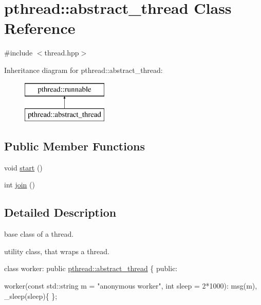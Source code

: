 \hypertarget{classpthread_1_1abstract__thread}{}\section{pthread\+:\+:abstract\+\_\+thread Class Reference}
\label{classpthread_1_1abstract__thread}


{\ttfamily \#include $<$thread.\+hpp$>$}

Inheritance diagram for pthread\+:\+:abstract\+\_\+thread\+:\begin{figure}[H]
\begin{center}
\leavevmode
\includegraphics[height=2.000000cm]{classpthread_1_1abstract__thread}
\end{center}
\end{figure}
\subsection*{Public Member Functions}
\begin{DoxyCompactItemize}
\item 
void \hyperlink{classpthread_1_1abstract__thread_ab121718028f3ca68d45db84d10ff2a3a}{start} ()
\item 
int \hyperlink{classpthread_1_1abstract__thread_aedac81bb9eb76ba92c49c48d797ea25b}{join} ()
\end{DoxyCompactItemize}


\subsection{Detailed Description}
base class of a thread.

utility class, that wraps a thread. 
\begin{DoxyPre}{\ttfamily 
class worker: public \hyperlink{classpthread_1_1abstract__thread}{pthread::abstract\_thread} \{
public:}\end{DoxyPre}



\begin{DoxyPre}{\ttfamily   worker(const std::string m = "anonymous worker", int sleep = 2*1000): msg(m), \_sleep(sleep)\{
  \};}\end{DoxyPre}



